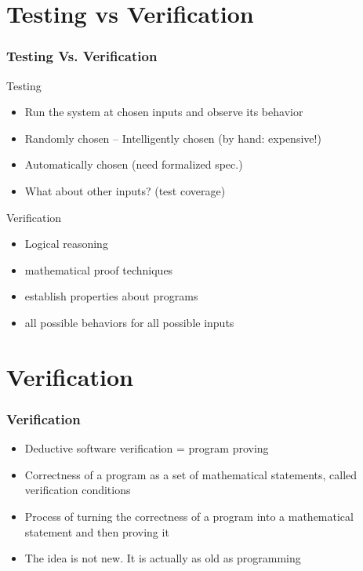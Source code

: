 \documentclass{beamer}
\begin{document}
\section{Testing vs Verification}
\begin{frame}
        \frametitle{Testing Vs. Verification}
	\begin{minipage}[t]{0.48\linewidth}
        Testing
		\begin{itemize}
            \item Run the system at chosen inputs and observe its behavior
            \item Randomly chosen – Intelligently chosen (by hand: expensive!)
      	\item  Automatically chosen (need formalized spec.)
            \item What about other inputs? (test coverage)
        \end{itemize}
    \end{minipage}
    \hfill
	\pause
    \begin{minipage}[t]{0.48\linewidth}
        Verification
        \begin{itemize}
            \item Logical reasoning
            \item mathematical proof techniques
            \item establish properties about programs
	    \item all possible behaviors for all possible inputs
        \end{itemize}
    \end{minipage}
\end{frame}



\section{Verification}
\begin{frame}
        \frametitle{Verification}
\begin{itemize}

  \item {Deductive software verification = program proving}
  \item {Correctness of a program as a set of mathematical statements, called verification
conditions}
  \item {Process of turning the correctness of a program into a mathematical statement and then
proving it}
  \item {The idea is not new. It is actually as old as programming}

\end{itemize}

\end{frame}
\end{document}

